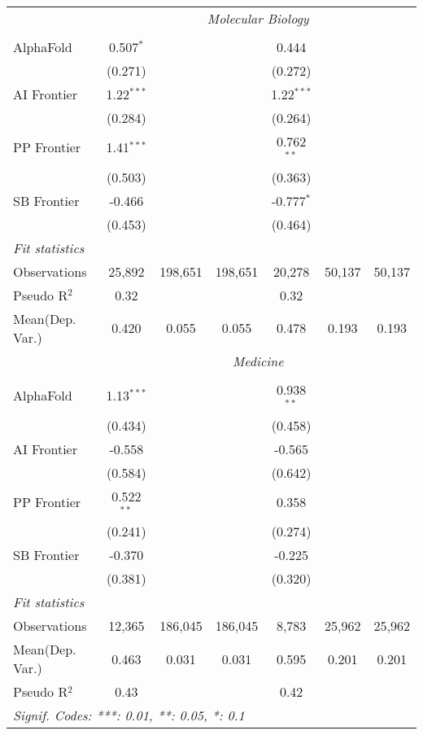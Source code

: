 \begin{tabular}{lcccccc}
 & \multicolumn{6}{c}{\textit{Molecular Biology}} \\ \\
   AlphaFold    & 0.507$^{*}$  &         &         & 0.444        &        &   \\   
                & (0.271)      &         &         & (0.272)      &        &   \\   
   AI Frontier  & 1.22$^{***}$ &         &         & 1.22$^{***}$ &        &   \\   
                & (0.284)      &         &         & (0.264)      &        &   \\   
   PP Frontier  & 1.41$^{***}$ &         &         & 0.762$^{**}$ &        &   \\   
                & (0.503)      &         &         & (0.363)      &        &   \\   
   SB Frontier  & -0.466       &         &         & -0.777$^{*}$ &        &   \\   
                & (0.453)      &         &         & (0.464)      &        &   \\   
   \midrule
   \emph{Fit statistics}\\
   Observations & 25,892       & 198,651 & 198,651 & 20,278       & 50,137 & 50,137\\  
   Pseudo R$^2$ & 0.32         &         &         & 0.32         &        & \\  
   
Mean(Dep. Var.) & 0.420 & 0.055 & 0.055 & 0.478 & 0.193 & 0.193 \\
 & \multicolumn{6}{c}{\textit{Medicine}} \\ \\
   AlphaFold    & 1.13$^{***}$ &         &         & 0.938$^{**}$ &        &   \\   
                & (0.434)      &         &         & (0.458)      &        &   \\   
   AI Frontier  & -0.558       &         &         & -0.565       &        &   \\   
                & (0.584)      &         &         & (0.642)      &        &   \\   
   PP Frontier  & 0.522$^{**}$ &         &         & 0.358        &        &   \\   
                & (0.241)      &         &         & (0.274)      &        &   \\   
   SB Frontier  & -0.370       &         &         & -0.225       &        &   \\   
                & (0.381)      &         &         & (0.320)      &        &   \\   
   \midrule
   \emph{Fit statistics}\\
   Observations & 12,365       & 186,045 & 186,045 & 8,783        & 25,962 & 25,962\\  
Mean(Dep. Var.) & 0.463 & 0.031 & 0.031 & 0.595 & 0.201 & 0.201 \\
   Pseudo R$^2$ & 0.43         &         &         & 0.42         &        & \\  
   \midrule \midrule
   \multicolumn{7}{l}{\emph{Signif. Codes: ***: 0.01, **: 0.05, *: 0.1}}\\
\end{tabular}
\par\endgroup
